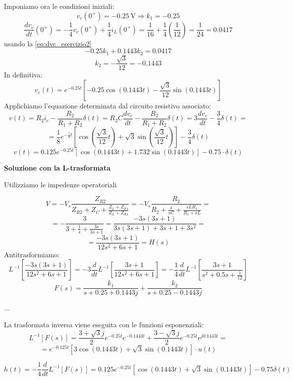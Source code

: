 Imponiamo ora le condizioni iniziali:
$$
v_c(0^+) = \SI{-0.25}{\volt} \Rightarrow k_1 = -0.25
$$
$$
\frac{dv_c}{dt}(0^+) = -\frac{1}{4}v_c(0^+) + \frac{1}{4}i_L(0^+) = \frac{1}{16} + \frac{1}{4}\left(\frac{1}{12}\right) = \frac{1}{24} = 0.0417
$$
usando la \ref{eq:dvc_esercizio2}
$$
-0.25 k_1 + 0.1443k_2 = 0.0417
$$
$$
k_2 = -\frac{\sqrt{3}}{12} = -0.1443
$$
In definitiva:
$$
v_c(t) = e^{-0.25 t}\left[-0.25\cos(0.1443 t) - \frac{\sqrt{3}}{12}\sin(0.1443 t)\right]
$$
Applichiamo l'equazione determinata dal circuito resistivo associato:
$$
v(t) = R_2 i_c - \frac{R_2}{R_1+R_2}\delta(t) = R_2C\frac{dv_c}{dt} - \frac{R_2}{R_1+R_2}\delta(t) =
3\frac{dv_c}{dt} - \frac{3}{4}\delta(t)=
$$
$$
= \frac{1}{8}e^{-\frac{1}{4}t}\left[\cos\left(\frac{\sqrt{3}}{12}t\right) + \sqrt{3}\sin\left(\frac{\sqrt{3}}{12}t\right)\right] - \frac{3}{4}\delta(t)
$$
$$
v(t) = 0.125 e^{-0.25 t}\left[\cos(0.1443 t) + 1.732\sin(0.1443 t)\right] - 0.75\cdot\delta(t)
$$

\textbf{Soluzione con la L-trasformata}

Utilizziamo le impedenze operatoriali

$$
V = -V_s\frac{Z_{R2}}{Z_{R2}+Z_C+\frac{Z_L+Z_{R1}}{Z_L+Z_{R1}}} = -V_s\frac{R_2}{R_2 + \frac{1}{sC} + 
\frac{sLR_1}{R_1+sL}} =
$$
$$
= -\frac{3}{3+\frac{1}{s} + \frac{3 s}{3s + 1}} = \frac{-3 s (3s + 1)}{3s(3s+1) + 3s+1 + 3s^2} = 
$$
$$
= \frac{- 3s(3s+1)}{12s^2+6s+1} = H(s)
$$
Antitrasformiamo:
$$
L^{-1}\left[\frac{-3s(3s+1)}{12s^2+6s +1}\right] = -3 \frac{d}{dt}L^{-1} \left[\frac{3s+1}{12s^2+6s+1}\right] = -\frac{1}{4} \frac{d}{dt} L^{-1} \left[\frac{3s+1}{s^2+0.5s + \frac{1}{12}}\right]
$$
$$
F(s) = \frac{k_1}{s+0.25+0.1443j} + \frac{k_2}{s+0.25-0.1443j}
$$

...

La trasformata inversa viene eseguita con le funzioni esponenziali:
$$
L^{-1}[F(s)] = \frac{3+\sqrt{3}j}{2}e^{-0.25 t}e^{-0.1443 t} + \frac{3-\sqrt{3}j}{2}e^{-0.25 t}e^{j0.1443 t} =$$
$$
= e^{-0.125 t}\left[3\cos(0.1443 t) + \sqrt{3}\sin(0.1443 t)\right]\cdot u(t)
$$

$$
h(t) = -\frac{1}{4} \frac{d}{dt}L^{-1}[F(s)] = 0.125 e ^{-0.25 t}[\cos(0.1443 t) + \sqrt{3}\sin(0.1443 t)] - 0.75\delta(t)
$$
